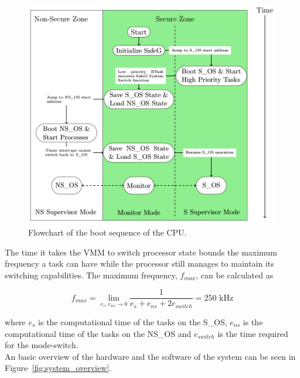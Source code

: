 \begin{figure}[H]
\centering
\includegraphics[width=\textwidth]{./img/literature_modeswitch.png}
\caption{Flowchart of the boot sequence of the CPU. \cite{zaki2016}}\label{fig:modeswitch}
\end{figure}

The time it takes the VMM to switch processor state bounds the maximum frequency a task can have while the processor still manages to maintain its switching capabilities. The maximum frequency, $f_{max}$, can be calculated as

$$f_{max} = \lim_{e_s, e_{ns} \to 0} \frac{1}{e_s+e_{ns}+2e_{switch}} = 250\textrm{ kHz}$$

where $e_s$ is the computational time of the tasks on the S\_OS, $e_{ns}$ is the computational time of the tasks on the NS\_OS and $e_{switch}$ is the time required for the mode-switch.\\

An basic overview of the hardware and the software of the system can be seen in Figure~\ref{fig:system_overview}.

